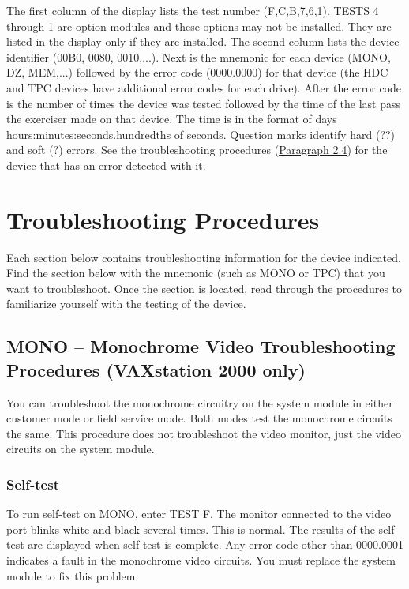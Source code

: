 The first column of the display lists the test number (F,C,B,7,6,1). TESTS 4
through 1 are option modules and these options may not be installed. They
are listed in the display only if they are installed. The second column lists
the device identifier (00B0, 0080, 0010,...). Next is the mnemonic for each
device (MONO, DZ, MEM,...) followed by the error code (0000.0000) for
that device (the HDC and TPC devices have additional error codes for each
drive). After the error code is the number of times the device was tested
followed by the time of the last pass the exerciser made on that device.
The time is in the format of days hours:minutes:seconds.hundredths of
seconds. Question marks identify hard (??) and soft (?) errors. See the
troubleshooting procedures (\hyperlink{section.2.4}{Paragraph 2.4}) for 
the device that has an error detected with it.

\section{Troubleshooting Procedures}

Each section below contains troubleshooting information for the device 
indicated. Find the section below with the mnemonic (such as MONO or TPC)
that you want to troubleshoot. Once the section is located, read through the
procedures to familiarize yourself with the testing of the device.

\subsection{MONO -- Monochrome Video Troubleshooting Procedures (VAXstation 2000 only)}

You can troubleshoot the monochrome circuitry on the system module
in either customer mode or field service mode. Both modes test the
monochrome circuits the same. This procedure does not troubleshoot the
video monitor, just the video circuits on the system module.

\subsubsection{Self-test}

To run self-test on MONO, enter TEST F. The monitor connected to the
video port blinks white and black several times. This is normal. The results
of the self-test are displayed when self-test is complete. Any error code
other than 0000.0001 indicates a fault in the monochrome video circuits.
You must replace the system module to fix this problem.

